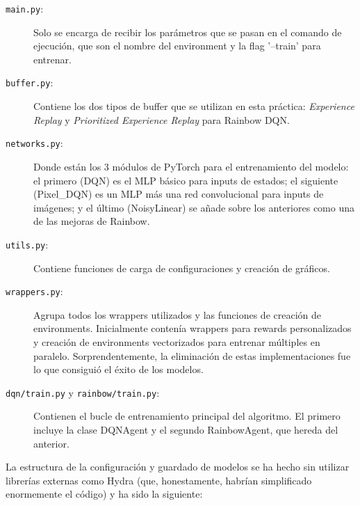 \documentclass[onecolumn]{cwpreport} %
\begin{document}
\begin{description}
    \item[\texttt{main.py}:] Solo se encarga de recibir los parámetros que se pasan en el comando de ejecución, que son el nombre del environment y la flag '--train' para entrenar.
    \item[\texttt{buffer.py}:] Contiene los dos tipos de buffer que se utilizan en esta práctica: \textit{Experience Replay} y \textit{Prioritized Experience Replay} para Rainbow DQN.
    \item[\texttt{networks.py}:] Donde están los 3 módulos de PyTorch para el entrenamiento del modelo: el primero (DQN) es el MLP básico para inputs de estados; el siguiente (Pixel\_DQN) es un MLP más una red convolucional para inputs de imágenes; y el último (NoisyLinear) se añade sobre los anteriores como una de las mejoras de Rainbow.
    \item[\texttt{utils.py}:] Contiene funciones de carga de configuraciones y creación de gráficos.
    \item[\texttt{wrappers.py}:] Agrupa todos los wrappers utilizados y las funciones de creación de environments. Inicialmente contenía wrappers para rewards personalizados y creación de environments vectorizados para entrenar múltiples en paralelo. Sorprendentemente, la eliminación de estas implementaciones fue lo que consiguió el éxito de los modelos.
    \item[\texttt{dqn/train.py} y \texttt{rainbow/train.py}:] Contienen el bucle de entrenamiento principal del algoritmo. El primero incluye la clase DQNAgent y el segundo RainbowAgent, que hereda del anterior.
\end{description}

La estructura de la configuración y guardado de modelos se ha hecho sin utilizar librerías externas como Hydra (que, honestamente, habrían simplificado enormemente el código) y ha sido la siguiente:
\end{document}
